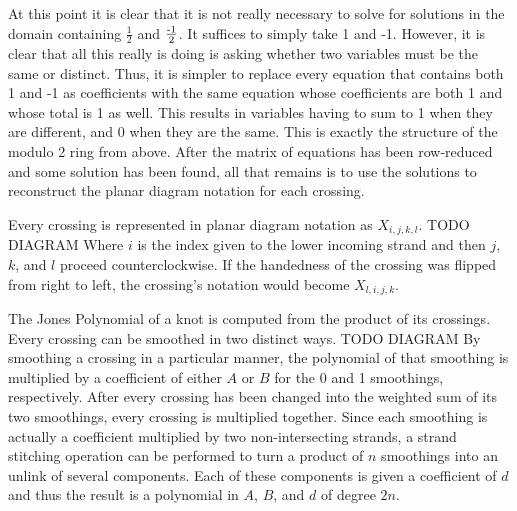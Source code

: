 \begin{paper}
At this point it is clear that it is not really necessary to solve for solutions
in the domain containing $\frac12$ and $\frac{\text-1}2$.
It suffices to simply take 1 and -1.
However, it is clear that all this really is doing is asking whether two
variables must be the same or distinct.
Thus, it is simpler to replace every equation that contains both 1 and -1 as
coefficients with the same equation whose coefficients are both 1 and whose
total is 1 as well.
This results in variables having to sum to 1 when they are different, and 0 when
they are the same.
This is exactly the structure of the modulo 2 ring from above.
After the matrix of equations has been row-reduced and some solution has been
found, all that remains is to use the solutions to reconstruct the planar
diagram notation for each crossing.

Every crossing is represented in planar diagram notation as $X_{i,j,k,l}$. TODO
DIAGRAM
Where $i$ is the index given to the lower incoming strand and then $j$, $k$, and
$l$ proceed counterclockwise.
If the handedness of the crossing was flipped from right to left, the crossing's
notation would become $X_{l,i,j,k}$.


The Jones Polynomial of a knot is computed from the product of its crossings.
Every crossing can be smoothed in two distinct ways. TODO DIAGRAM
By smoothing a crossing in a particular manner, the polynomial of that smoothing
is multiplied by a coefficient of either $A$ or $B$ for the 0 and 1 smoothings,
respectively.
After every crossing has been changed into the weighted sum of its two
smoothings, every crossing is multiplied together.
Since each smoothing is actually a coefficient multiplied by two
non-intersecting strands, a strand stitching operation can be performed to turn
a product of $n$ smoothings into an unlink of several components.
Each of these components is given a coefficient of $d$ and thus the result is a
polynomial in $A$, $B$, and $d$ of degree $2n$.
\end{paper}

